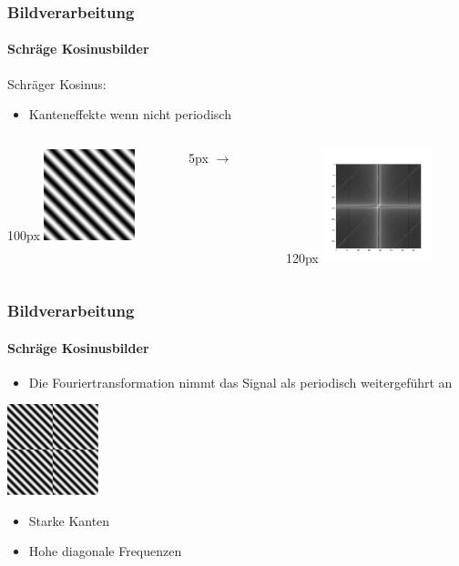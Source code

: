 \begin{frame}
    \frametitle{Bildverarbeitung}
    \framesubtitle{Schräge Kosinusbilder}
    Schräger Kosinus:
    \begin{itemize}
        \item Kanteneffekte wenn nicht periodisch
    \end{itemize}
    \begin{columns}
        \begin{column}{100px}   
            \includegraphics[width=100px]{images/04-applications-image-cos-rot-45-0.png}
        \end{column} 
        \hspace*{-30px}
        \begin{column}{5px}
            $\rightarrow$
        \end{column}
        \hspace*{-30px}
        \begin{column}{120px}
            \includegraphics[width=120px]{images/04-applications-image-cos-rot-45-0-ft.png}
        \end{column}
    \end{columns}
\end{frame}

\begin{frame}
    \frametitle{Bildverarbeitung}
    \framesubtitle{Schräge Kosinusbilder}

    \begin{itemize}
        \item Die Fouriertransformation nimmt das Signal als periodisch weitergeführt an
    \end{itemize}

    \vspace{10px}
    \centering
    \includegraphics[width=100px]{images/04-applications-image-rot-45.png}

    \vspace{5px}
    \begin{itemize}
        \item Starke Kanten
        \item Hohe diagonale Frequenzen
    \end{itemize}
\end{frame}

